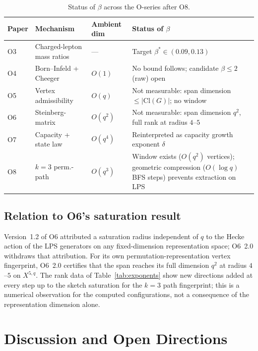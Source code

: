 \documentclass[11pt,a4paper]{article}
\theoremstyle{definition}
\theoremstyle{remark}
\begin{document}
    \begin{table}[ht]
      \centering
      \caption{Status of $\beta$ across the O-series after O8.}
      \label{tab:oseries}
      \begin{tabular}{lllp{5.8cm}}
        \toprule
        Paper & Mechanism & Ambient dim & Status of $\beta$ \\
        \midrule
        O3 & Charged-lepton mass ratios & --- &
        Target $\beta^* \in (0.09, 0.13)$ \\
        O4 & Born--Infeld + Cheeger & $O(1)$ &
        No bound follows; candidate $\beta \leq 2$ (raw) open \\
        O5 & Vertex admissibility & $O(q)$ &
        Not measurable: span dimension $\le |\mathrm{Cl}(G)|$; no window \\
        O6 & Steinberg-matrix & $O(q^2)$ &
        Not measurable: span dimension $q^2$, full rank at radius $4$--$5$ \\
        O7 & Capacity + state law & $O(q^4)$ &
        Reinterpreted as capacity growth exponent $\delta$ \\
        O8 & $k=3$ perm.-path & $O(q^3)$ &
        Window exists ($O(q^2)$ vertices); geometric compression
        ($O(\log q)$ BFS steps) prevents extraction on LPS \\
        \bottomrule
      \end{tabular}
    \end{table}

  \subsection{Relation to O6's saturation result}
    \label{sec:interpretation-hecke}

    Version~1.2 of O6 attributed a saturation radius independent of $q$ to the Hecke action of
    the LPS generators on any fixed-dimension representation space; O6~2.0 withdraws that
    attribution.
    For its own permutation-representation vertex fingerprint, O6~2.0 certifies that the span
    reaches its full dimension $q^2$ at radius $4$--$5$ on $X^{5,q}$.
    The rank data of Table~\ref{tab:exponents} show new directions added at every step up to the
    sketch saturation for the $k=3$ path fingerprint; this is a numerical observation for the
    computed configurations, not a consequence of the representation dimension alone.

  \section{Discussion and Open Directions}
  \label{sec:discussion}
\end{document}
